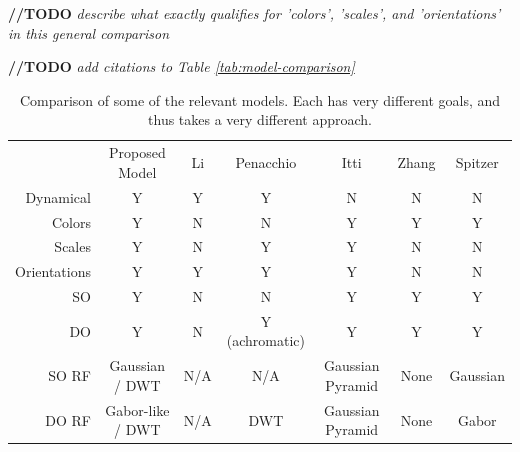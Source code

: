 \documentclass[journal,onecolumn]{IEEEtran}
\begin{document}
\textbf{//TODO} \textit{describe what exactly qualifies for 'colors', 'scales', and 'orientations' in this general comparison}

\textbf{//TODO} \textit{add citations to Table \ref{tab:model-comparison}}

\begin{table}
    \centering
    \begin{threeparttable}
    \caption{Comparison of some of the relevant models. Each has very different goals, and thus takes a very different approach.}
    \begin{tabular}{rcccccc}
        \multicolumn{1}{r|}{}                 & Proposed Model        & Li \cite{li:1999}     & Penacchio \cite{otazu:plosone} & Itti \cite{itti:1999} & Zhang            & Spitzer \\ \cline{1-7}
        \multicolumn{1}{r|}{Dynamical}        & Y                      & Y                    & Y                              & N                     & N                & N               \\
        \multicolumn{1}{r|}{Colors}           & Y                      & N                    & N                              & Y                     & Y                & Y               \\
        \multicolumn{1}{r|}{Scales}           & Y                      & N                    & Y                              & Y                     & N                & N               \\
        \multicolumn{1}{r|}{Orientations}     & Y                      & Y                    & Y                              & Y                     & N                & N               \\
        \multicolumn{1}{r|}{SO}               & Y                      & N                    & N                              & Y                     & Y                & Y               \\
        \multicolumn{1}{r|}{DO}               & Y                      & N                    & Y (achromatic)                 & Y                     & Y                & Y               \\
        \multicolumn{1}{r|}{SO RF}            & Gaussian / DWT         & N/A                  & N/A                            & Gaussian Pyramid      & None             & Gaussian        \\
        \multicolumn{1}{r|}{DO RF}            & Gabor-like / DWT       & N/A                  & DWT                            & Gaussian Pyramid      & None             & Gabor           \\

\end{tabular}
\end{threeparttable}
\end{table}
\end{document}
